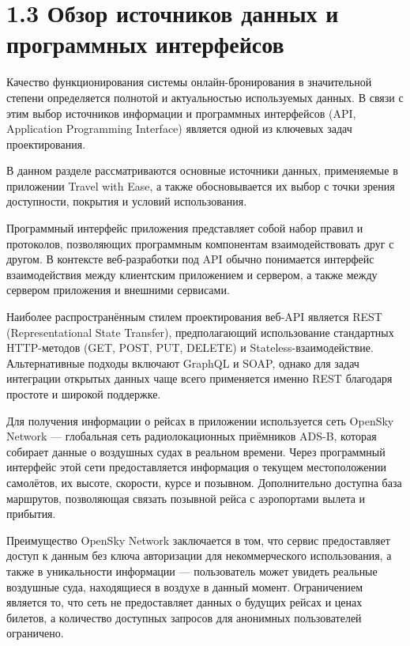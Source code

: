\documentclass[14pt,a4paper,oneside]{extreport}
\begin{document}

\section*{1.3 Обзор источников данных и программных интерфейсов}

Качество функционирования системы онлайн-бронирования в значительной степени определяется полнотой и актуальностью используемых данных. В связи с этим выбор источников информации и программных интерфейсов (API, Application Programming Interface) является одной из ключевых задач проектирования.

В данном разделе рассматриваются основные источники данных, применяемые в приложении Travel with Ease, а также обосновывается их выбор с точки зрения доступности, покрытия и условий использования.

Программный интерфейс приложения представляет собой набор правил и протоколов, позволяющих программным компонентам взаимодействовать друг с другом. В контексте веб-разработки под API обычно понимается интерфейс взаимодействия между клиентским приложением и сервером, а также между сервером приложения и внешними сервисами.

Наиболее распространённым стилем проектирования веб-API является REST (Representational State Transfer), предполагающий использование стандартных HTTP-методов (GET, POST, PUT, DELETE) и Stateless-взаимодействие. Альтернативные подходы включают GraphQL и SOAP, однако для задач интеграции открытых данных чаще всего применяется именно REST благодаря простоте и широкой поддержке.

Для получения информации о рейсах в приложении используется сеть OpenSky Network — глобальная сеть радиолокационных приёмников ADS-B, которая собирает данные о воздушных судах в реальном времени. Через программный интерфейс этой сети предоставляется информация о текущем местоположении самолётов, их высоте, скорости, курсе и позывном. Дополнительно доступна база маршрутов, позволяющая связать позывной рейса с аэропортами вылета и прибытия.

Преимущество OpenSky Network заключается в том, что сервис предоставляет доступ к данным без ключа авторизации для некоммерческого использования, а также в уникальности информации — пользователь может увидеть реальные воздушные суда, находящиеся в воздухе в данный момент. Ограничением является то, что сеть не предоставляет данных о будущих рейсах и ценах билетов, а количество доступных запросов для анонимных пользователей ограничено.
\end{document}
